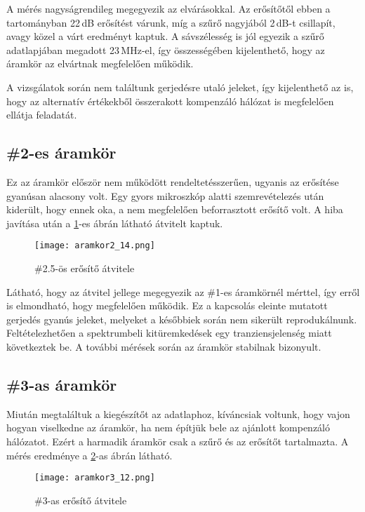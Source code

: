 A mérés nagyságrendileg megegyezik az elvárásokkal. Az erősítőtől ebben a tartományban 22\,dB erősítést várunk, míg a szűrő nagyjából 2\,dB-t csillapít, avagy közel a várt eredményt kaptuk. A sávszélesség is jól egyezik a szűrő adatlapjában\cite{SAW} megadott 23\,MHz-el, így összességében kijelenthető, hogy az áramkör az elvártnak megfelelően működik.

A vizsgálatok során nem találtunk gerjedésre utaló jeleket, így kijelenthető az is, hogy az alternatív értékekből összerakott kompenzáló hálózat is megfelelően ellátja feladatát.


\subsection*{\#2-es áramkör}

Ez az áramkör először nem működött rendeltetésszerűen, ugyanis az erősítése gyanúsan alacsony volt. Egy gyors mikroszkóp alatti szemrevételezés után kiderült, hogy ennek oka, a nem megfelelően beforrasztott erősítő volt. A hiba javítása után a \ref{fig:erosito2}-es ábrán látható átvitelt kaptuk.

\begin{figure}[!ht]
	\centering
	\texttt{[image: aramkor2\_14.png]}
	\caption{\#2.5-ös erősítő átvitele}
	\label{fig:erosito2}
\end{figure}

Látható, hogy az átvitel jellege megegyezik az \#1-es áramkörnél mérttel, így erről is elmondható, hogy megfelelően működik. Ez a kapcsolás eleinte mutatott gerjedés gyanús jeleket, melyeket a későbbiek során nem sikerült reprodukálnunk. Feltételezhetően a spektrumbeli kitüremkedések egy tranziensjelenség miatt következtek be. A további mérések során az áramkör stabilnak bizonyult.


\subsection*{\#3-as áramkör}

Miután megtaláltuk a kiegészítőt az adatlaphoz\cite{PGA_comp}, kíváncsiak voltunk, hogy vajon hogyan viselkedne az áramkör, ha nem építjük bele az ajánlott kompenzáló hálózatot. Ezért a harmadik áramkör csak a szűrő és az erősítőt tartalmazta. A mérés eredménye a \ref{fig:erosito3}-as ábrán látható.

\begin{figure}[!ht]
	\centering
	\texttt{[image: aramkor3\_12.png]}
	\caption{\#3-as erősítő átvitele}
	\label{fig:erosito3}
\end{figure}

